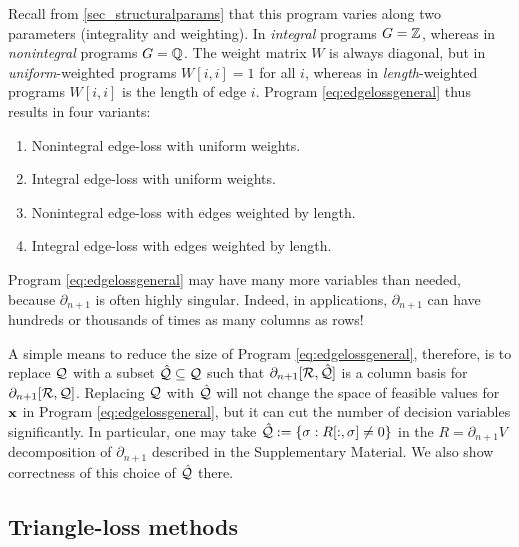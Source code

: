  Recall from \se \eqref{sec_structuralparams} that this program varies along two parameters (integrality and weighting).  In \emph{integral} programs $G = \mathbb{Z}$, whereas in \emph{nonintegral} programs $G = \mathbb{Q}$.  The weight matrix $W$ is always diagonal, but in \emph{uniform}-weighted programs $W[i,i] = 1$ for all $i$, whereas in \emph{length}-weighted programs $W[i,i]$ is the length of edge $i$.  Program \ref{eq:edgelossgeneral} thus results in four variants:
  
\begin{enumerate}[style=multiline]
    \item[\namedlabel{itm:edge_NIU}{$\Edge\NI\unif$}] Nonintegral edge-loss with uniform weights.
    \item[\namedlabel{itm:edge_IU}{$\Edge\I\unif$}] Integral edge-loss with uniform weights.
    \item[\namedlabel{itm:edge_NIL}{$\Edge\NI\len$}] Nonintegral edge-loss with edges weighted by length. 
    \item[\namedlabel{itm:edge_IL}{$\Edge\I\len$}] Integral edge-loss with edges weighted by length. 
\end{enumerate}

  
Program \eqref{eq:edgelossgeneral} may have many more variables than needed, because $\partial_{n+1}$ is often highly singular.  Indeed, in  applications, $\partial_{n+1}$ can have hundreds or thousands of times as many columns as rows!

A simple means to reduce the size of Program \eqref{eq:edgelossgeneral}, therefore, is to replace $\mathcal Q$ with a subset $\hat {\mathcal Q} \subseteq \mathcal Q$ such that $\partial_{n+1}[\mathcal R, \hat {\mathcal Q}]$ is a column basis for $\partial_{n+1}[\mathcal R, \mathcal Q]$.  Replacing $\mathcal Q$ with $\hat {\mathcal Q}$ will not change the space of feasible values for $\mathbf{x}$ in Program \eqref{eq:edgelossgeneral}, but it can cut the number of decision variables significantly. In particular, one may take $\hat {\mathcal Q} : = \{ \sigma : R[:, \sigma] \neq 0\}$ in the $R = \partial_{n+1} V$ decomposition of $\partial_{n+1}$ described in the Supplementary Material.  We also show correctness of this choice of $\hat {\mathcal Q}$ there.
 

\subsection{Triangle-loss methods}
\label{sec:trianglelossmethdos}

